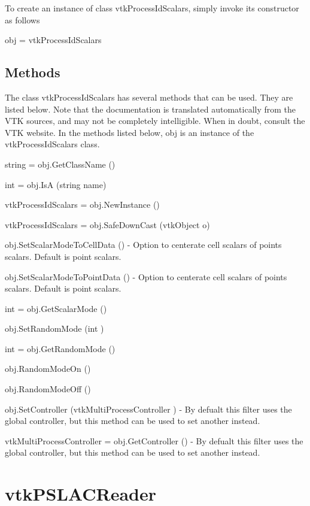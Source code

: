 To create an instance of class vtk\-Process\-Id\-Scalars, simply invoke its constructor as follows \begin{DoxyVerb}  obj = vtkProcessIdScalars
\end{DoxyVerb}
 \hypertarget{vtkwidgets_vtkxyplotwidget_Methods}{}\subsection{Methods}\label{vtkwidgets_vtkxyplotwidget_Methods}
The class vtk\-Process\-Id\-Scalars has several methods that can be used. They are listed below. Note that the documentation is translated automatically from the V\-T\-K sources, and may not be completely intelligible. When in doubt, consult the V\-T\-K website. In the methods listed below, {\ttfamily obj} is an instance of the vtk\-Process\-Id\-Scalars class. 
\begin{DoxyItemize}
\item {\ttfamily string = obj.\-Get\-Class\-Name ()}  
\item {\ttfamily int = obj.\-Is\-A (string name)}  
\item {\ttfamily vtk\-Process\-Id\-Scalars = obj.\-New\-Instance ()}  
\item {\ttfamily vtk\-Process\-Id\-Scalars = obj.\-Safe\-Down\-Cast (vtk\-Object o)}  
\item {\ttfamily obj.\-Set\-Scalar\-Mode\-To\-Cell\-Data ()} -\/ Option to centerate cell scalars of points scalars. Default is point scalars.  
\item {\ttfamily obj.\-Set\-Scalar\-Mode\-To\-Point\-Data ()} -\/ Option to centerate cell scalars of points scalars. Default is point scalars.  
\item {\ttfamily int = obj.\-Get\-Scalar\-Mode ()}  
\item {\ttfamily obj.\-Set\-Random\-Mode (int )}  
\item {\ttfamily int = obj.\-Get\-Random\-Mode ()}  
\item {\ttfamily obj.\-Random\-Mode\-On ()}  
\item {\ttfamily obj.\-Random\-Mode\-Off ()}  
\item {\ttfamily obj.\-Set\-Controller (vtk\-Multi\-Process\-Controller )} -\/ By defualt this filter uses the global controller, but this method can be used to set another instead.  
\item {\ttfamily vtk\-Multi\-Process\-Controller = obj.\-Get\-Controller ()} -\/ By defualt this filter uses the global controller, but this method can be used to set another instead.  
\end{DoxyItemize}\hypertarget{vtkparallel_vtkpslacreader}{}\section{vtk\-P\-S\-L\-A\-C\-Reader}\label{vtkparallel_vtkpslacreader}

